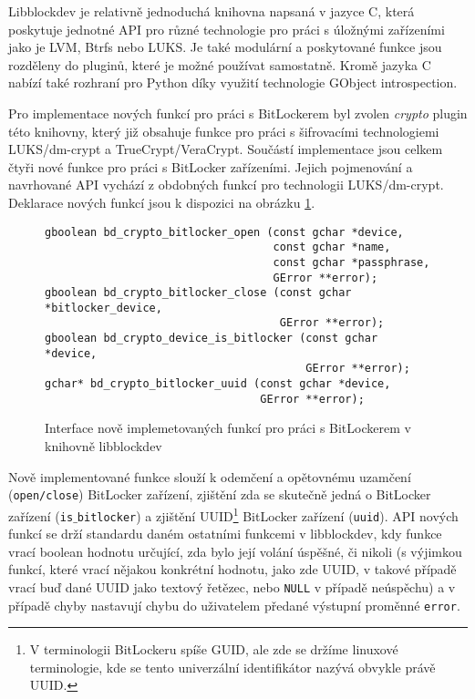 Libblockdev je relativně jednoduchá knihovna napsaná v jazyce C, která poskytuje jednotné API pro různé technologie pro práci s úložnými zařízeními jako je LVM, Btrfs nebo LUKS. Je také modulární a poskytované funkce jsou rozděleny do pluginů, které je možné používat samostatně. Kromě jazyka C nabízí také rozhraní pro Python díky využití technologie GObject introspection.\cite{Podzimek2015}

Pro implementace nových funkcí pro práci s BitLockerem byl zvolen \emph{crypto} plugin této knihovny, který již obsahuje funkce pro práci s šifrovacími technologiemi LUKS/dm-crypt a TrueCrypt/VeraCrypt. Součástí implementace jsou celkem čtyři nové funkce pro práci s BitLocker zařízeními. Jejich pojmenování a navrhované API vychází z obdobných funkcí pro technologii LUKS/dm-crypt. Deklarace nových funkcí jsou k dispozici na obrázku \ref{fig:libblockdev-bitlocker}.

\begin{figure}[h]
		\centering
		\captionsetup{width=0.65\linewidth}
\begin{lstlisting}[frame=none, basicstyle=\ttfamily\small, columns=fullflexible, keepspaces=true, xleftmargin=.1\textwidth, xrightmargin=.1\textwidth]
gboolean bd_crypto_bitlocker_open (const gchar *device,
                                   const gchar *name,
                                   const gchar *passphrase,
                                   GError **error);
gboolean bd_crypto_bitlocker_close (const gchar *bitlocker_device,
                                    GError **error);
gboolean bd_crypto_device_is_bitlocker (const gchar *device,
                                        GError **error);
gchar* bd_crypto_bitlocker_uuid (const gchar *device,
                                 GError **error);

\end{lstlisting}
		\caption{Interface nově implemetovaných funkcí pro práci s BitLockerem v knihovně libblockdev}
		\label{fig:libblockdev-bitlocker}
\end{figure}

Nově implementované funkce slouží k odemčení a opětovnému uzamčení (\texttt{open/close}) BitLocker zařízení, zjištění zda se skutečně jedná o BitLocker zařízení (\texttt{is$\_$bitlocker}) a zjištění UUID\footnote{V terminologii BitLockeru spíše GUID, ale zde se držíme linuxové terminologie, kde se tento univerzální identifikátor nazývá obvykle právě UUID.} BitLocker zařízení (\texttt{uuid}). API nových funkcí se drží standardu daném ostatními funkcemi v libblockdev, kdy funkce vrací boolean hodnotu určující, zda bylo její volání úspěšné, či nikoli (s výjimkou funkcí, které vrací nějakou konkrétní hodnotu, jako zde UUID, v takové případě vrací buď dané UUID jako textový řetězec, nebo \texttt{NULL} v případě neúspěchu) a v případě chyby nastavují chybu do uživatelem předané výstupní proměnné \texttt{error}.


